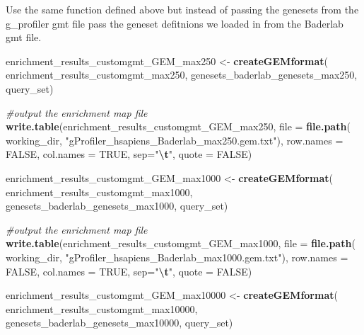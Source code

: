 \documentclass[
]{book}
\newenvironment{Shaded}{\begin{snugshade}}{\end{snugshade}}
\newcommand{\AttributeTok}[1]{\textcolor[rgb]{0.13,0.29,0.53}{#1}}
\newcommand{\CommentTok}[1]{\textcolor[rgb]{0.56,0.35,0.01}{\textit{#1}}}
\newcommand{\ConstantTok}[1]{\textcolor[rgb]{0.56,0.35,0.01}{#1}}
\newcommand{\FunctionTok}[1]{\textcolor[rgb]{0.13,0.29,0.53}{\textbf{#1}}}
\newcommand{\NormalTok}[1]{#1}
\newcommand{\OtherTok}[1]{\textcolor[rgb]{0.56,0.35,0.01}{#1}}
\newcommand{\SpecialCharTok}[1]{\textcolor[rgb]{0.81,0.36,0.00}{\textbf{#1}}}
\newcommand{\StringTok}[1]{\textcolor[rgb]{0.31,0.60,0.02}{#1}}
\begin{document}
Use the same function defined above but instead of passing the genesets from the g\_profiler gmt file pass the geneset defitnions we loaded in from the Baderlab gmt file.

\begin{Shaded}
\begin{Highlighting}[]
\NormalTok{enrichment\_results\_customgmt\_GEM\_max250 }\OtherTok{\textless{}{-}} \FunctionTok{createGEMformat}\NormalTok{(}
\NormalTok{                                    enrichment\_results\_customgmt\_max250, }
\NormalTok{                                    genesets\_baderlab\_genesets\_max250, }
\NormalTok{                                    query\_set)}

\CommentTok{\#output the enrichment map file}
\FunctionTok{write.table}\NormalTok{(enrichment\_results\_customgmt\_GEM\_max250, }
                  \AttributeTok{file =} \FunctionTok{file.path}\NormalTok{(}
\NormalTok{                    working\_dir, }\StringTok{"gProfiler\_hsapiens\_Baderlab\_max250.gem.txt"}\NormalTok{),}
                  \AttributeTok{row.names =} \ConstantTok{FALSE}\NormalTok{, }
                  \AttributeTok{col.names =} \ConstantTok{TRUE}\NormalTok{, }\AttributeTok{sep=}\StringTok{"}\SpecialCharTok{\textbackslash{}t}\StringTok{"}\NormalTok{,}
                  \AttributeTok{quote =} \ConstantTok{FALSE}\NormalTok{)}
       
\NormalTok{enrichment\_results\_customgmt\_GEM\_max1000 }\OtherTok{\textless{}{-}} \FunctionTok{createGEMformat}\NormalTok{(}
\NormalTok{                                  enrichment\_results\_customgmt\_max1000,}
\NormalTok{                                  genesets\_baderlab\_genesets\_max1000, }
\NormalTok{                                  query\_set)}

\CommentTok{\#output the enrichment map file}
\FunctionTok{write.table}\NormalTok{(enrichment\_results\_customgmt\_GEM\_max1000, }
                  \AttributeTok{file =} \FunctionTok{file.path}\NormalTok{(}
\NormalTok{                    working\_dir, }\StringTok{"gProfiler\_hsapiens\_Baderlab\_max1000.gem.txt"}\NormalTok{),}
                  \AttributeTok{row.names =} \ConstantTok{FALSE}\NormalTok{, }
                  \AttributeTok{col.names =} \ConstantTok{TRUE}\NormalTok{, }\AttributeTok{sep=}\StringTok{"}\SpecialCharTok{\textbackslash{}t}\StringTok{"}\NormalTok{,}
                  \AttributeTok{quote =} \ConstantTok{FALSE}\NormalTok{)}

\NormalTok{enrichment\_results\_customgmt\_GEM\_max10000 }\OtherTok{\textless{}{-}} \FunctionTok{createGEMformat}\NormalTok{(}
\NormalTok{                                  enrichment\_results\_customgmt\_max10000,}
\NormalTok{                                  genesets\_baderlab\_genesets\_max10000, }
\NormalTok{                                  query\_set)}


\end{Highlighting}
\end{Shaded}
\end{document}
